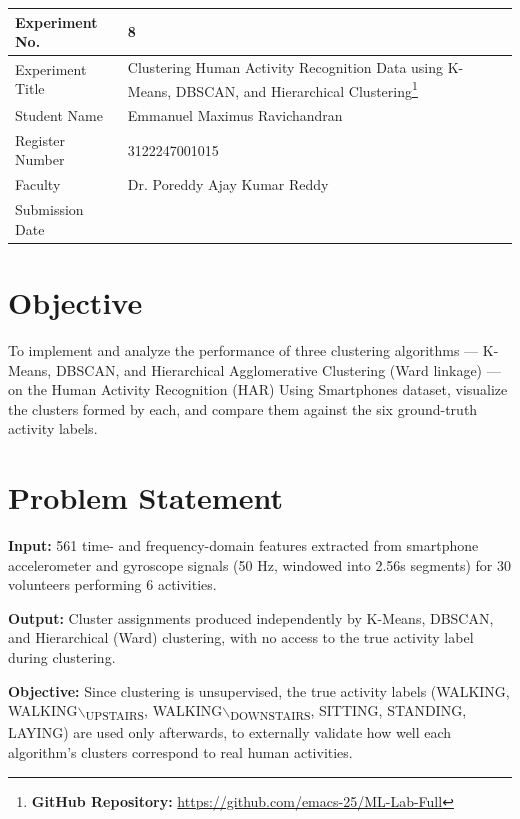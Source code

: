 \documentclass[12pt,a4paper]{article}
\author{root}
\date{\today}
\title{}
\begin{document}
\begin{center}
\begin{tabular}{|p{4cm}|p{11cm}|}
\hline
Experiment No. & 8\\[0pt]
\hline
Experiment Title & Clustering Human Activity Recognition Data using K-Means, DBSCAN, and Hierarchical Clustering\footnote{\textbf{GitHub Repository: }\url{https://github.com/emacs-25/ML-Lab-Full}}\\[0pt]
\hline
Student Name & Emmanuel Maximus Ravichandran\\[0pt]
\hline
Register Number & 3122247001015\\[0pt]
\hline
Faculty & Dr. Poreddy Ajay Kumar Reddy\\[0pt]
\hline
Submission Date & \\[0pt]
\hline
\end{tabular}
\end{center}

\section{Objective}
\label{sec:org9c0950a}

To implement and analyze the performance of three clustering algorithms —
K-Means, DBSCAN, and Hierarchical Agglomerative Clustering (Ward linkage) —
on the Human Activity Recognition (HAR) Using Smartphones dataset, visualize
the clusters formed by each, and compare them against the six ground-truth
activity labels.

\section{Problem Statement}
\label{sec:org91a2274}

\textbf{Input:} 561 time- and frequency-domain features extracted from smartphone
accelerometer and gyroscope signals (50 Hz, windowed into 2.56s segments)
for 30 volunteers performing 6 activities.

\textbf{Output:} Cluster assignments produced independently by K-Means, DBSCAN, and
Hierarchical (Ward) clustering, with no access to the true activity label
during clustering.

\textbf{Objective:} Since clustering is unsupervised, the true activity labels
(WALKING, WALKING$\backslash$\textsubscript{UPSTAIRS}, WALKING$\backslash$\textsubscript{DOWNSTAIRS}, SITTING, STANDING, LAYING)
are used only afterwards, to externally validate how well each algorithm's
clusters correspond to real human activities.
\end{document}
